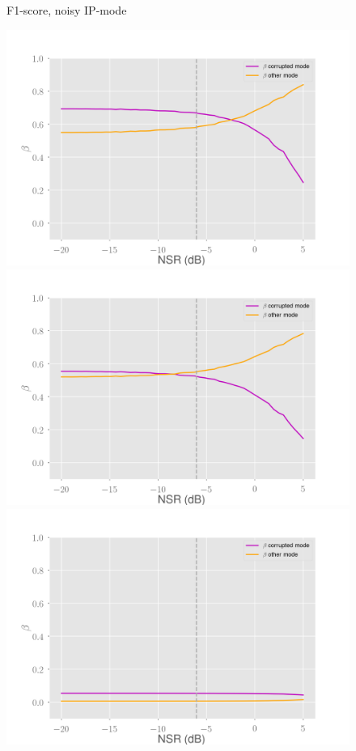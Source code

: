 \documentclass[10pt]{beamer}
\begin{document}
\begin{frame}
\begin{multicols}{2}
\begin{figure}
\begin{overprint}
\end{overprint}
\caption{F1-score, noisy IP-mode}
\end{figure}
\columnbreak
\begin{figure}
\centering
\begin{overprint}
    \includegraphics[scale=0.2]{figs/no-capacity-ip-noisy-beta}
    \includegraphics[scale=0.2]{figs/normal-ip-noisy-beta}
    \includegraphics[scale=0.2]{figs/high-capacity-ip-noisy-beta}

\end{overprint}
\end{figure}
\end{multicols}
\end{frame}
\end{document}
